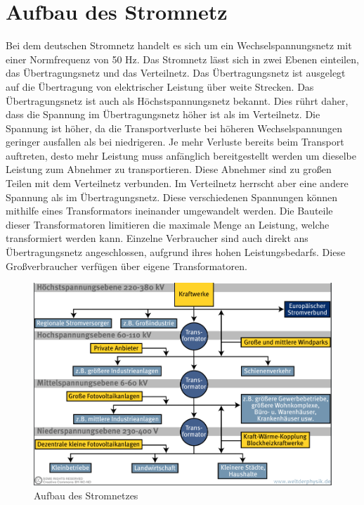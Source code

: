 \section{Aufbau des Stromnetz}
\label{capBack:Stromnetz}
Bei dem deutschen Stromnetz handelt es sich um ein Wechselspannungsnetz mit einer Normfrequenz von 50 Hz. Das Stromnetz lässt sich in zwei Ebenen einteilen, das Übertragungsnetz und das Verteilnetz. Das Übertragungsnetz ist ausgelegt auf die Übertragung von elektrischer Leistung über weite Strecken. Das Übertragungsnetz ist auch als Höchstspannungsnetz bekannt. Dies rührt daher, dass die Spannung im Übertragungsnetz höher ist als im Verteilnetz. Die Spannung ist höher, da die Transportverluste bei höheren Wechselspannungen geringer ausfallen als bei niedrigeren. Je mehr Verluste bereits beim Transport auftreten, desto mehr Leistung muss anfänglich bereitgestellt werden um dieselbe Leistung zum Abnehmer zu transportieren. Diese Abnehmer sind zu großen Teilen mit dem Verteilnetz verbunden. Im Verteilnetz herrscht aber eine andere Spannung als im Übertragungsnetz. Diese verschiedenen Spannungen können mithilfe eines Transformators ineinander umgewandelt werden. Die Bauteile dieser Transformatoren limitieren die maximale Menge an Leistung, welche transformiert werden kann. Einzelne Verbraucher sind auch direkt ans Übertragungsnetz angeschlossen, aufgrund ihres hohen Leistungsbedarfs. Diese Großverbraucher verfügen über eigene Transformatoren.
\begin{figure}[h!]
	\includegraphics[width=\linewidth]{img/Stromnetz1.png}
	\caption{Aufbau des Stromnetzes}
	\label{Abb1_Stromnetz}
\end{figure}


